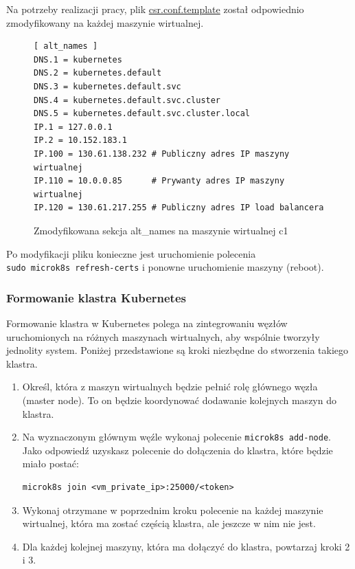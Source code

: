 Na potrzeby realizacji pracy, plik \url{csr.conf.template} został odpowiednio zmodyfikowany na każdej maszynie wirtualnej.

\begin{figure}[H]
    \begin{verbatim}
[ alt_names ]
DNS.1 = kubernetes
DNS.2 = kubernetes.default
DNS.3 = kubernetes.default.svc
DNS.4 = kubernetes.default.svc.cluster
DNS.5 = kubernetes.default.svc.cluster.local
IP.1 = 127.0.0.1
IP.2 = 10.152.183.1
IP.100 = 130.61.138.232 # Publiczny adres IP maszyny wirtualnej
IP.110 = 10.0.0.85      # Prywanty adres IP maszyny wirtualnej
IP.120 = 130.61.217.255 # Publiczny adres IP load balancera
    \end{verbatim}
    \caption{Zmodyfikowana sekcja alt\_names na maszynie wirtualnej c1}
    \label{fig:zmodyfikowana-konfiguracja-alt-names}
\end{figure}

Po modyfikacji pliku konieczne jest uruchomienie polecenia \\\texttt{sudo microk8s refresh-certs} i ponowne uruchomienie maszyny (reboot).

\subsubsection{Formowanie klastra Kubernetes}

Formowanie klastra w Kubernetes polega na zintegrowaniu węzłów uruchomionych na różnych maszynach wirtualnych, aby wspólnie tworzyły jednolity system. Poniżej przedstawione są kroki niezbędne do stworzenia takiego klastra.

\begin{enumerate}
    \item Określ, która z maszyn wirtualnych będzie pełnić rolę głównego węzła (master node). To on będzie koordynować dodawanie kolejnych maszyn do klastra.
    \item Na wyznaczonym głównym węźle wykonaj polecenie \texttt{microk8s add-node}. Jako odpowiedź uzyskasz polecenie do dołączenia do klastra, które będzie miało postać:
    \begin{verbatim}
microk8s join <vm_private_ip>:25000/<token>
    \end{verbatim}
    \item Wykonaj otrzymane w poprzednim kroku polecenie na każdej maszynie wirtualnej, która ma zostać częścią klastra, ale jeszcze w nim nie jest.
    \item Dla każdej kolejnej maszyny, która ma dołączyć do klastra, powtarzaj kroki 2 i 3.
\end{enumerate}
